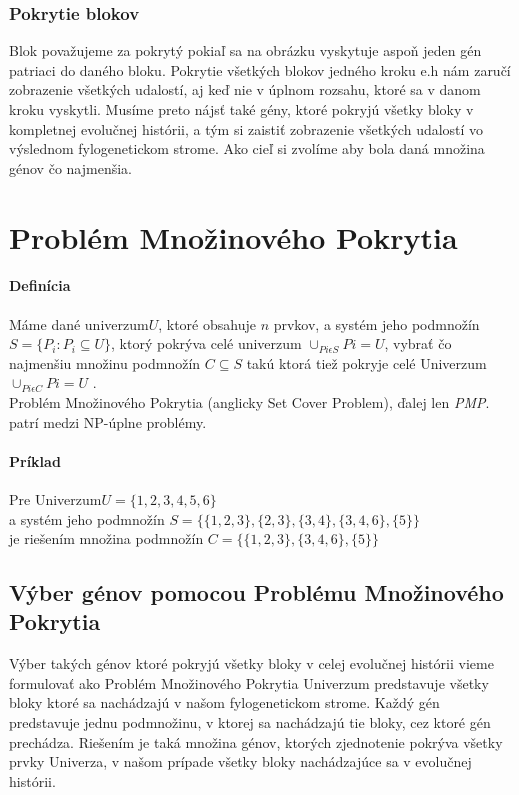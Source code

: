 \subsubsection{Pokrytie blokov}
Blok považujeme za pokrytý pokiaľ sa na obrázku vyskytuje aspoň jeden gén patriaci do daného bloku.
Pokrytie všetkých blokov jedného kroku e.h nám zaručí zobrazenie všetkých udalostí, aj keď nie v úplnom rozsahu,
ktoré sa v danom kroku vyskytli.
Musíme preto nájsť také gény, ktoré pokryjú všetky bloky v kompletnej evolučnej histórii,
a tým si zaistiť zobrazenie všetkých udalostí vo výslednom fylogenetickom strome. 
Ako cieľ si zvolíme aby bola daná množina génov čo najmenšia.
\section{Problém Množinového Pokrytia}
\paragraph{Definícia}
Máme dané univerzum$U$, ktoré obsahuje $n$ prvkov, a systém jeho podmnožín \(S=\{ P_i : P_i \subseteq U \}\), 
ktorý pokrýva celé univerzum \(\cup_{Pi \epsilon S} Pi = U\),
vybrať čo najmenšiu množinu podmnožín \(C \subseteq S\)
takú ktorá tiež pokryje celé Univerzum \(\cup_{Pi \epsilon C} Pi = U \) .\\
Problém Množinového Pokrytia (anglicky Set Cover Problem), ďalej len \emph{PMP}. patrí medzi NP-úplne problémy.\cite{Karp}
\paragraph{Príklad}
Pre Univerzum$U=\{1,2,3,4,5,6\}$ \\a systém jeho podmnožín
$S=\{\{1,2,3\},\{2,3\},\{3,4\},\{3,4,6\},\{5\}\}$ \\
je riešením množina podmnožín $C=\{\{1,2,3\},\{3,4,6\},\{5\}\}$ 
\subsection{Výber génov pomocou Problému Množinového Pokrytia}
Výber takých génov ktoré pokryjú všetky bloky v celej evolučnej histórii vieme formulovať
ako Problém Množinového Pokrytia 
Univerzum predstavuje všetky bloky ktoré sa nachádzajú v našom fylogenetickom strome.
Každý gén predstavuje jednu podmnožinu, v ktorej sa nachádzajú tie bloky, cez ktoré gén prechádza.
Riešením je taká množina génov, ktorých zjednotenie pokrýva všetky prvky Univerza, v našom prípade všetky bloky nachádzajúce sa v evolučnej histórii.

